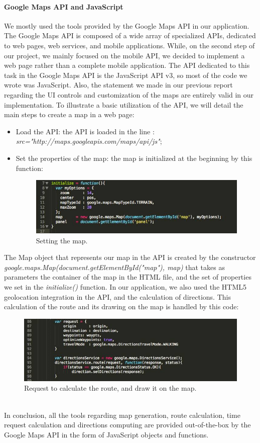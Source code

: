 				\paragraph{Google Maps API and JavaScript}
				We mostly used the tools provided by the Google Maps API in our application. The Google Maps API is composed of a wide array of specialized APIs, dedicated to web pages, web services, and mobile applications. While, on the second step of our project, we mainly focused on the mobile API, we decided to implement a web page rather than a complete mobile application. The API dedicated to this task in the Google Maps API is the JavaScript API v3, so most of the code we wrote was JavaScript. Also, the statement we made in our previous report regarding the UI controls and customization of the maps are entirely valid in our implementation.
				To illustrate a basic utilization of the API, we will detail the main steps to create a map in a web page:
				\begin{itemize}
				\item{Load the API}: the API is loaded in the line :
					\textit{src="http://maps.googleapis.com/maps/api/js"};
				\item{Set the properties of the map}: the map is initialized at the beginning by this function:
				\begin{figure}[h!]
				\centering
				\includegraphics[scale=0.5]{input/map_code.jpg}
				\caption{Setting the map.}
				\label{fig:map_code}
				\end{figure}
				\end{itemize}
				The Map object that represents our map in the API is created by the constructor \newline \textit{google.maps.Map(document.getElementById("map"), map)} that takes as parameters the container of the map in the HTML file, and the set of properties we set in the \textit{initialize()} function.
				In our application, we also used the HTML5 geolocation integration in the API, and the calculation of directions. This calculation of the route and its drawing on the map is handled by this code:
				\begin{figure}[h!]
					\centering
					\includegraphics[scale=0.45]{input/directions_code.jpg}
					\caption{Request to calculate the route, and draw it on the map.}
					\label{fig:directions_code}
				\end{figure}
				\\
				In conclusion, all the tools regarding map generation, route calculation, time request calculation and directions computing are provided out-of-the-box by the Google Maps API in the form of JavaScript objects and functions.